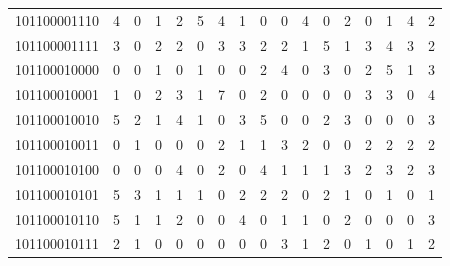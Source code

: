 \documentclass[10pt,a4paper]{article}
\begin{document}
\begin{longtable}{ |c|c|c|c|c|c|c|c|c|c|c|c|c|c|c|c|c| }
    101100001110              & 4                            & 0                                & 1                            & 2                              & 5   & 4   & 1   & 0   & 0   & 4   & 0   & 2   & 0   & 1   & 4   & 2   \\
    101100001111              & 3                            & 0                                & 2                            & 2                              & 0   & 3   & 3   & 2   & 2   & 1   & 5   & 1   & 3   & 4   & 3   & 2   \\
    101100010000              & 0                            & 0                                & 1                            & 0                              & 1   & 0   & 0   & 2   & 4   & 0   & 3   & 0   & 2   & 5   & 1   & 3   \\
    101100010001              & 1                            & 0                                & 2                            & 3                              & 1   & 7   & 0   & 2   & 0   & 0   & 0   & 0   & 3   & 3   & 0   & 4   \\
    101100010010              & 5                            & 2                                & 1                            & 4                              & 1   & 0   & 3   & 5   & 0   & 0   & 2   & 3   & 0   & 0   & 0   & 3   \\
    101100010011              & 0                            & 1                                & 0                            & 0                              & 0   & 2   & 1   & 1   & 3   & 2   & 0   & 0   & 2   & 2   & 2   & 2   \\
    101100010100              & 0                            & 0                                & 0                            & 4                              & 0   & 2   & 0   & 4   & 1   & 1   & 1   & 3   & 2   & 3   & 2   & 3   \\
    101100010101              & 5                            & 3                                & 1                            & 1                              & 1   & 0   & 2   & 2   & 2   & 0   & 2   & 1   & 0   & 1   & 0   & 1   \\
    101100010110              & 5                            & 1                                & 1                            & 2                              & 0   & 0   & 4   & 0   & 1   & 1   & 0   & 2   & 0   & 0   & 0   & 3   \\
    101100010111              & 2                            & 1                                & 0                            & 0                              & 0   & 0   & 0   & 0   & 3   & 1   & 2   & 0   & 1   & 0   & 1   & 2   \\

\end{longtable}
\end{document}
